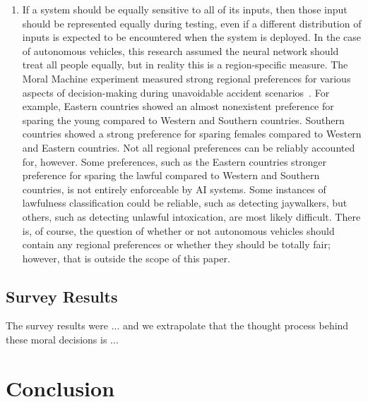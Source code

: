 \documentclass{report}
\begin{document}
\begin{enumerate}
\begin{enumerate}
        \item If a system should be equally sensitive to all of its inputs, then those input should
        be represented equally during testing, even if a different distribution of inputs is
        expected to be encountered when the system is deployed. In the case of autonomous vehicles,
        this research assumed the neural network should treat all people equally, but in reality
        this is a region-specific measure. The Moral Machine experiment measured strong regional
        preferences for various aspects of decision-making during unavoidable accident
        scenarios~\cite{awad2018moral}. For example, Eastern countries showed an almost nonexistent
        preference for sparing the young compared to Western and Southern countries. Southern
        countries showed a strong preference for sparing females compared to Western and Eastern
        countries. Not all regional preferences can be reliably accounted for, however. Some
        preferences, such as the Eastern countries stronger preference for sparing the lawful
        compared to Western and Southern countries, is not entirely enforceable by AI systems. Some
        instances of lawfulness classification could be reliable, such as detecting jaywalkers, but
        others, such as detecting unlawful intoxication, are most likely difficult. There is, of
        course, the question of whether or not autonomous vehicles should contain any regional
        preferences or whether they should be totally fair; however, that is outside the scope of
        this paper.
    \end{enumerate}
\end{enumerate}
    
\FloatBarrier
\section{Survey Results}

The survey results were ... and we extrapolate that the thought process behind these moral decisions
is ...

\FloatBarrier
\chapter{Conclusion}
\end{document}
